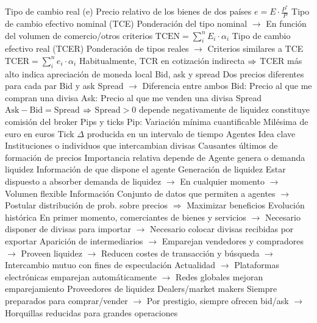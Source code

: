 \documentclass{nuevotema}
\begin{document}
\begin{esquemal}
				\4 Tipo de cambio real (e)
				\4[] Precio relativo de los bienes de dos países
				\4[] $e = E \cdot \frac{P^*}{P}$
				\4 Tipo de cambio efectivo nominal (TCE)
				\4[] Ponderación del tipo nominal
				\4[] $\to$ En función del volumen de comercio/otros criterios
				\4[] $\text{TCEN} = \sum_i^n E_i \cdot \alpha_i$
				\4 Tipo de cambio efectivo real (TCER)
				\4[] Ponderación de tipos reales
				\4[] $\to$ Criterios similares a TCE
				\4[] $\text{TCER} = \sum_i^n e_i \cdot \alpha_i$
				\4[] Habitualmente, TCR en cotización indirecta
				\4[] $\Rightarrow$ TCER más alto indica apreciación de moneda local
			\3 Bid, ask y spread
				\4 Dos precios diferentes para cada par
				\4[] Bid y ask
				\4[] Spread $\to$ Diferencia entre ambos
				\4 Bid:
				\4[] Precio al que me compran una divisa
				\4 Ask:
				\4[] Precio al que me venden una divisa
				\4 Spread
				\4[] $\text{Ask}-\text{Bid} = \text{Spread}$ $\Rightarrow$ $\text{Spread} > 0$
				\4[] depende negativamente de liquidez
				\4[] constituye comisión del broker
			\3 Pips y ticks
				\4 Pip:
				\4[] Variación mínima cuantificable
				\4[] Milésima de euro en euros
				\4 Tick
				\4[] $\Delta$ producida en un intervalo de tiempo
		\2 Agentes
			\3 Idea clave
				\4 Instituciones o individuos que intercambian divisas
				\4 Causantes últimos de formación de precios
				\4 Importancia relativa depende de
				\4[] Agente genera o demanda liquidez
				\4[] Información de que dispone el agente
				\4 Generación de liquidez
				\4[] Estar dispuesto a absorber demanda de liquidez
				\4[] $\to$ En cualquier momento
				\4[] $\to$ Volumen flexible
				\4 Información
				\4[] Conjunto de datos que permiten a agentes
				\4[] $\to$ Postular distribución de prob. sobre precios
				\4[] $\Rightarrow$ Maximizar beneficios
				\4 Evolución histórica
				\4[] En primer momento, comerciantes de bienes y servicios
				\4[] $\to$ Necesario disponer de divisas para importar
				\4[] $\to$ Necesario colocar divisas recibidas por exportar
				\4[] Aparición de intermediarios
				\4[] $\to$ Emparejan vendedores y compradores
				\4[] $\to$ Proveen liquidez
				\4[] $\to$ Reducen costes de transacción y búsqueda
				\4[] $\to$ Intercambio mutuo con fines de especulación
				\4[] Actualidad
				\4[] $\to$ Plataformas electrónicas emparejan automáticamente
				\4[] $\to$ Redes globales mejoran emparejamiento
			\3 Proveedores de liquidez
				\4 Dealers/market makers
				\4[] Siempre preparados para comprar/vender
				\4[] $\to$ Por prestigio, siempre ofrecen bid/ask
				\4[] $\to$ Horquillas reducidas para grandes operaciones

\end{esquemal}
\end{document}
